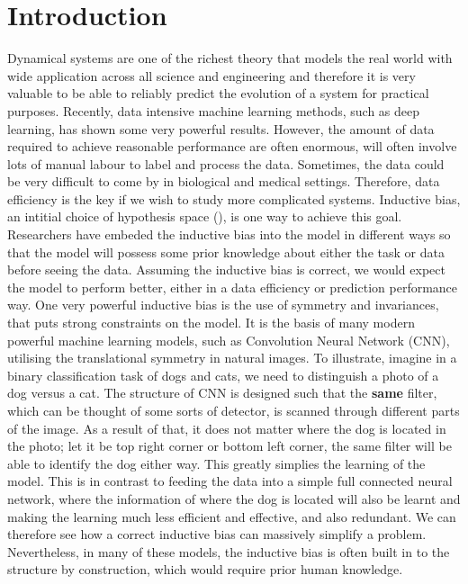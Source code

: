 \documentclass{statsmsc}
\begin{document}
\chapter{Introduction}
Dynamical systems are one of the richest theory that models the real world with wide application across all science and engineering and therefore it is very valuable to be able to reliably predict the evolution of a system for practical purposes.
Recently, data intensive machine learning methods, such as deep learning, has shown some very powerful results. 
However, the amount of data required to achieve reasonable performance are often enormous, will often involve lots of manual labour to label and process the data.
Sometimes, the data could be very difficult to come by in biological and medical settings.
Therefore, data efficiency is the key if we wish to study more complicated systems.
Inductive bias, an intitial choice of hypothesis space (\cite{Baxter2000}), is one way to achieve this goal.
Researchers have embeded the inductive bias into the model in different ways so that the model will possess some prior knowledge about either the task or data before seeing the data.
Assuming the inductive bias is correct, we would expect the model to perform better, either in a data efficiency or prediction performance way.
One very powerful inductive bias is the use of symmetry and invariances, that puts strong constraints on the model. 
It is the basis of many modern powerful machine learning models, such as Convolution Neural Network (CNN), utilising the translational symmetry in natural images.
To illustrate, imagine in a binary classification task of dogs and cats, we need to distinguish a photo of a dog versus a cat. 
The structure of CNN is designed such that the \textbf{same} filter, which can be thought of some sorts of detector, is scanned through different parts of the image.  
As a result of that, it does not matter where the dog is located in the photo; let it be top right corner or bottom left corner, the same filter will be able to identify the dog either way.
This greatly simplies the learning of the model.
This is in contrast to feeding the data into a simple full connected neural network, where the information of where the dog is located will also be learnt and making the learning much less efficient and effective, and also redundant.
We can therefore see how a correct inductive bias can massively simplify a problem.
Nevertheless, in many of these models, the inductive bias is often built in to the structure by construction, which would require prior human knowledge.
\end{document}
